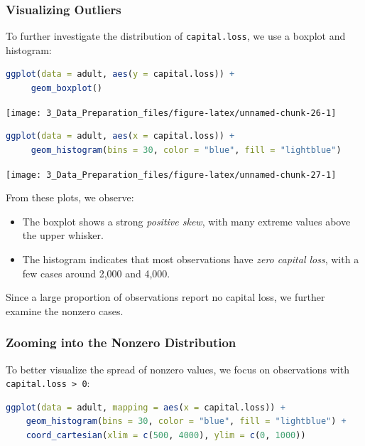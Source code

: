 \documentclass[
  11pt,
]{book}
\newcommand{\passthrough}[1]{#1}
\providecommand{\tightlist}{%
  \setlength{\itemsep}{0pt}\setlength{\parskip}{0pt}}
\theoremstyle{definition}
\theoremstyle{definition}
\theoremstyle{definition}
\theoremstyle{definition}
\theoremstyle{remark}
\begin{document}
\subsubsection*{Visualizing Outliers}\label{visualizing-outliers}


To further investigate the distribution of \passthrough{\lstinline!capital.loss!}, we use a boxplot and histogram:

\begin{lstlisting}[language=R]
ggplot(data = adult, aes(y = capital.loss)) +
     geom_boxplot()
\end{lstlisting}

\begin{center}\texttt{[image: 3\_Data\_Preparation\_files/figure-latex/unnamed-chunk-26-1]} \end{center}

\begin{lstlisting}[language=R]
ggplot(data = adult, aes(x = capital.loss)) +
     geom_histogram(bins = 30, color = "blue", fill = "lightblue")
\end{lstlisting}

\begin{center}\texttt{[image: 3\_Data\_Preparation\_files/figure-latex/unnamed-chunk-27-1]} \end{center}

From these plots, we observe:

\begin{itemize}
\tightlist
\item
  The boxplot shows a strong \emph{positive skew}, with many extreme values above the upper whisker.\\
\item
  The histogram indicates that most observations have \emph{zero capital loss}, with a few cases around 2,000 and 4,000.
\end{itemize}

Since a large proportion of observations report no capital loss, we further examine the nonzero cases.

\subsubsection*{Zooming into the Nonzero Distribution}\label{zooming-into-the-nonzero-distribution}


To better visualize the spread of nonzero values, we focus on observations with \passthrough{\lstinline!capital.loss > 0!}:

\begin{lstlisting}[language=R]
ggplot(data = adult, mapping = aes(x = capital.loss)) +
    geom_histogram(bins = 30, color = "blue", fill = "lightblue") +
    coord_cartesian(xlim = c(500, 4000), ylim = c(0, 1000))
\end{lstlisting}
\end{document}
